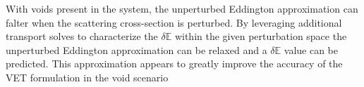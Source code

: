 \documentclass{anstrans}
\newcommand{\vr}{\vec{r}}
\newcommand{\vO}{\vec{\Omega}}
\newcommand{\bra}{\left\langle}
\newcommand{\ket}{\right\rangle}
\newcommand{\braSN}{\left\langle \! \left\langle}
\newcommand{\ketSN}{\right\rangle \! \right\rangle}
\newcommand{\sbraSN}{\left[ \! \left[}
\newcommand{\sketSN}{\right] \! \right]}
\newcommand{\sbra}{\left[}
\newcommand{\sket}{\right]}
\newcommand{\grad}{\vec{\nabla}}
\newcommand{\bound}{\partial V}
\newcommand{\vn}{\vec{n}}
\newcommand{\Edd}{\mathbb{E}}
\newcommand{\sigt}{\sigma_t}
\newcommand{\sigs}{\sigma_s}
\newcommand{\angSourced}{\frac{\delta q}{4 \pi}}
\newcommand{\qoi}{{\it QoI}\xspace}
\begin{document}
With voids present in the system, the unperturbed Eddington approximation can falter when the scattering cross-section is perturbed. By leveraging additional transport solves to characterize the $\delta \Edd$ within the given perturbation space the unperturbed Eddington approximation can be relaxed and a $\delta \Edd$ value can be predicted. This approximation appears to greatly improve the accuracy of the VET formulation in the void scenario

\appendix

%
\end{document}

